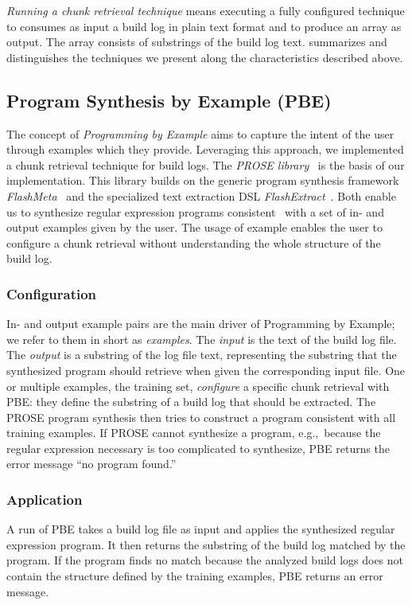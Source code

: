 \emph{Running a
chunk retrieval technique} means executing a fully configured
technique to consumes as input a build log in plain text format and to
produce an array as output.
The array consists of substrings of the
build log text.
 summarizes and distinguishes the techniques
we present along the
characteristics described above.

\subsection{Program Synthesis by Example (PBE)}
The concept of \emph{Programming by Example} aims to capture the
intent of the user through examples which they provide.
Leveraging this approach, we implemented a chunk retrieval technique
for build logs.
The \emph{PROSE library}~\cite{prose2019webpage} is the basis of
our implementation.
This library builds on the generic program synthesis framework
\emph{FlashMeta}~\cite{polozov2015flashmeta:} and the specialized
text extraction DSL \emph{FlashExtract}~\cite{le2014flashextract:}.
Both enable us to synthesize regular expression programs
consistent~\cite{mitchell1982generalization} with a set of in-
and output examples given by the user.
The usage of example enables the user to configure a chunk
retrieval without understanding the whole structure of
the build log.

\subsubsection{Configuration}
In- and output example pairs are the main driver of Programming by
Example; we refer to them in short as \emph{examples}.
The \emph{input} is the text of the build log file.
The \emph{output} is
a substring of the log file text, representing the
substring that the synthesized program should retrieve when
given the corresponding input file.
One or multiple examples, the
training set, \emph{configure} a specific chunk retrieval with PBE:
they define the substring of a build log that should be extracted.
The PROSE program synthesis then tries to construct a program
consistent with all training examples.
If PROSE cannot synthesize a program, e.g.,\
because the regular expression
necessary is too complicated to synthesize, PBE returns the
error message ``no program found.''

\subsubsection{Application}
A run of PBE takes a build log file as input and applies the
synthesized regular expression program.
It then returns the substring
of the build log matched by the program.
If the program finds no match because the analyzed build logs
does not contain the structure defined by the training examples,
PBE returns an error message.

